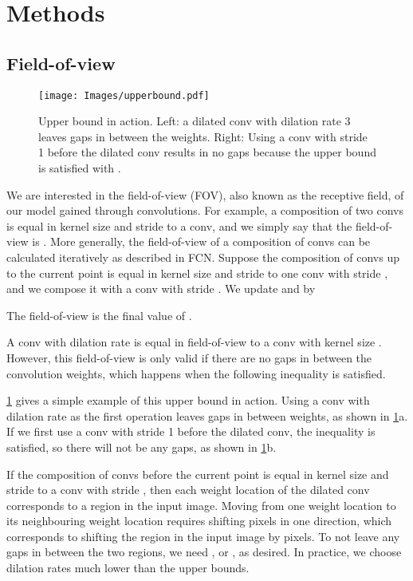 \documentclass[10pt,twocolumn,letterpaper]{article}
\begin{document}
\section{Methods}

\subsection{Field-of-view}
\label{sec:fov}
\begin{figure}
  \centering
    \texttt{[image: Images/upperbound.pdf]}

   \caption{Upper bound  in action. Left: a  dilated conv with dilation rate 3 leaves gaps in between the weights. Right: Using a  conv with stride 1 before the dilated conv results in no gaps because the upper bound is satisfied with .}
   \label{fig:upperbound}
\end{figure}

We are interested in the field-of-view (FOV), also known as the receptive field, of our model gained through convolutions. For example, a composition of two  convs is equal in kernel size and stride to a  conv, and we simply say that the field-of-view is . More generally, the field-of-view of a composition of convs can be calculated iteratively as described in FCN\cite{fcn}. Suppose the composition of convs up to the current point is equal in kernel size and stride to one  conv with stride , and we compose it with a  conv with stride . We update  and  by

The field-of-view is the final value of .

A  conv with dilation rate  is equal in field-of-view to a conv with kernel size . However, this field-of-view is only valid if there are no gaps in between the convolution weights, which happens when the following inequality is satisfied.

\cref{fig:upperbound} gives a simple example of this upper bound in action. Using a  conv with dilation rate  as the first operation leaves gaps in between weights, as shown in \cref{fig:upperbound}a. If we first use a  conv with stride 1 before the dilated conv, the inequality is satisfied, so there will not be any gaps, as shown in \cref{fig:upperbound}b.

If the composition of convs before the current point is equal in kernel size and stride to a  conv with stride , then each weight location of the dilated conv corresponds to a  region in the input image. Moving from one weight location to its neighbouring weight location requires shifting  pixels in one direction, which corresponds to shifting the  region in the input image by  pixels. To not leave any gaps in between the two regions, we need , or , as desired. In practice, we choose dilation rates much lower than the upper bounds.
\end{document}
